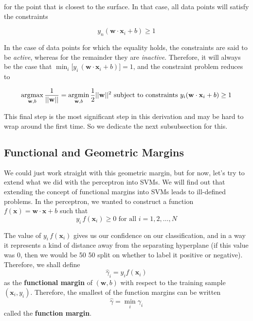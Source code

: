   for the point that is closest to the surface. In that case, all data points will satisfy the constraints 

  \begin{equation*}
    y_n (\mathbf{w} \cdot \mathbf{x}_i + b) \geq 1
  \end{equation*}

  In the case of data points for which the equality holds, the constraints are said to be \textit{active}, whereas for the remainder they are \textit{inactive}. Therefore, it will always be the case that $\min_i \big[ y_i \, (\mathbf{w} \cdot \mathbf{x}_i + b)\big] = 1$, and the constraint problem reduces to 

  \begin{equation*}
    \argmax_{\mathbf{w}, b} \frac{1}{||\mathbf{w}||} = \argmin_{\mathbf{w}, b} \frac{1}{2} ||\mathbf{w}||^2 \text{ subject to constraints } y_i (\mathbf{w} \cdot \mathbf{x}_i + b) \geq 1 
  \end{equation*}

  This final step is the most significant step in this derivation and may be hard to wrap around the first time. So we dedicate the next subsubsection for this. 

  \subsection{Functional and Geometric Margins} 

  We could just work straight with this geometric margin, but for now, let's try to extend what we did with the perceptron into SVMs. We will find out that extending the concept of functional margins into SVMs leads to ill-defined problems. In the perceptron, we wanted to construct a function $f(\mathbf{x}) = \mathbf{w} \cdot \mathbf{x} + b$ such that 
  \begin{equation*}
    y_i \, f(\mathbf{x}_i) \geq 0 \text{ for all } i = 1, 2, \ldots, N
  \end{equation*}

  \begin{definition}
    The value of $y_i \, f(\mathbf{x}_i)$ gives us our confidence on our classification, and in a way it represents a kind of distance away from the separating hyperplane (if this value was $0$, then we would be 50 50 split on whether to label it positive or negative). Therefore, we shall define 
    \begin{equation*}
        \hat{\gamma}_i = y_i f(\mathbf{x}_i) 
    \end{equation*}
  as the \textbf{functional margin} of $(\mathbf{w}, b)$ with respect to the training sample $(\mathbf{x}_i, y_i)$. Therefore, the smallest of the function margins can be written 
  \begin{equation*}
      \hat{\gamma} = \min_i \gamma_i 
  \end{equation*}
  called the \textbf{function margin}. 
  \end{definition}

